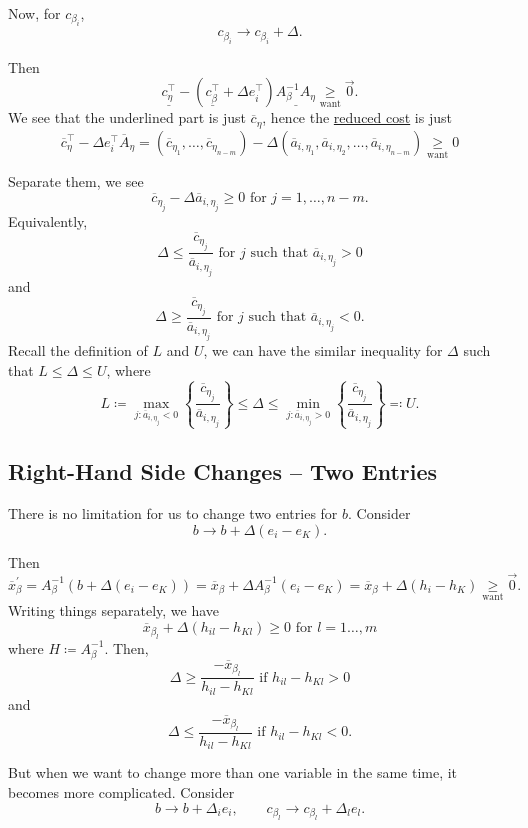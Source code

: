 Now, for \(c_{\beta_{i}}\),
\[
	c_{\beta_{i}}\to c_{\beta_{i}}+\Delta.
\]

Then
\[
	\underline{c_{\eta}^{\top}} - (\underline{c_{\beta}^{\top}} + \Delta e_{i}^{\top}) \underline{A^{-1}_{\beta}A_{\eta}}\underset{\text{want}}{\geq} \vec{0}.
\]
We see that the underlined part is just \(\overline{c}_{\eta}\), hence the \hyperref[def:reduced-cost]{reduced cost} is just
\[
	\overline{c}_{\eta}^{\top} - \Delta e_{i}^{\top}\overline{A}_{\eta} = (\overline{c}_{\eta_1}, \dots , \overline{c}_{\eta_{n-m}}) - \Delta(\overline{a}_{i, \eta_1}, \overline{a}_{i, \eta_2}, \dots , \overline{a}_{i, \eta_{n-m}})\underset{\text{want}}{\geq} 0
\]

Separate them, we see
\[
	\overline{c}_{\eta_{j}} - \Delta \overline{a}_{i, \eta_{j}} \geq 0 \text{ for }j = 1, \dots , n-m.
\]
Equivalently,
\[
	\Delta\leq \frac{\overline{c}_{\eta_{j}}}{\overline{a}_{i, \eta_{j}}} \text{ for }j \text{ such that }\overline{a}_{i, \eta_{j}}>0
\]
and
\[
	\Delta\geq \frac{\overline{c}_{\eta_{j}}}{\overline{a}_{i, \eta_{j}}} \text{ for }j \text{ such that }\overline{a}_{i, \eta_{j}}<0.
\]
Recall the definition of \(L\) and \(U\), we can have the similar inequality for \(\Delta\) such that \(L\leq \Delta\leq U\), where
\[
	L \coloneqq \max_{j\colon \overline{a}_{i, \eta_{j}} < 0}\left\{ \frac{\overline{c}_{\eta_{j}}}{\overline{a}_{i, \eta_{j}}} \right\} \leq \Delta \leq \min_{j\colon \overline{a}_{i, \eta_{j}} > 0}\left\{ \frac{\overline{c}_{\eta_{j}}}{\overline{a}_{i, \eta_{j}}} \right\} \eqqcolon U.
\]

\subsection{Right-Hand Side Changes -- Two Entries}
There is no limitation for us to change two entries for \(b\). Consider
\[
	b\to b+\Delta(e_{i} - e_{K}).
\]

Then
\[
	\overline{x}_{\beta}^\prime
	= A_{\beta}^{-1}(b+\Delta(e_{i} - e_K))
	= \overline{x}_{\beta}+\Delta A^{-1}_{\beta}(e_{i} - e_K)
	= \overline{x}_{\beta}+\Delta(h_{i} - h_K)
	\underset{\text{want}}{\geq} \vec{0}.
\]
Writing things separately, we have
\[
	\overline{x}_{\beta_l} + \Delta(h_{il} - h_{Kl}) \geq 0 \text{ for }l = 1\dots , m
\]
where \(H\coloneqq A^{-1}_{\beta}\). Then,
\[
	\Delta\geq \frac{-\overline{x}_{\beta_l}}{h_{il} - h_{Kl}} \text{ if }h_{il} - h_{Kl} > 0
\]
and
\[
	\Delta\leq \frac{-\overline{x}_{\beta_l}}{h_{il} - h_{Kl}} \text{ if }h_{il} - h_{Kl} < 0.
\]

But when we want to change more than one variable in the same time, it becomes more complicated. Consider
\[
	b\to b+\Delta_{i}e_{i}, \qquad c_{\beta_l}\to c_{\beta_l} + \Delta_l e_l.
\]

